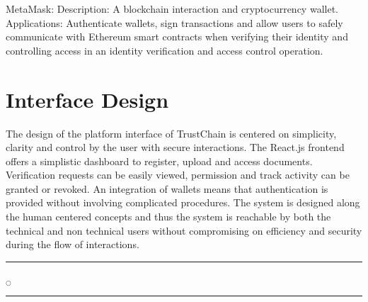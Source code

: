 MetaMask:
Description: A blockchain interaction and cryptocurrency wallet. Applications: Authenticate wallets, sign transactions and allow users to safely communicate with Ethereum smart contracts when verifying their identity and controlling access in an identity verification and access control operation.


\section{Interface Design}
The design of the platform interface of TrustChain is centered on simplicity, clarity and control by the user with secure interactions. The React.js frontend offers a simplistic dashboard to register, upload and access documents. Verification requests can be easily viewed, permission and track activity can be granted or revoked. An integration of wallets means that authentication is provided without involving complicated procedures. The system is designed along the human centered concepts and thus the system is reachable by both the technical and non technical users without compromising on efficiency and security during the flow of interactions.


\rule{0.49\textwidth}{0.75pt} $_{\bigcirc}$ \rule{0.49\textwidth}{0.75pt}\\
